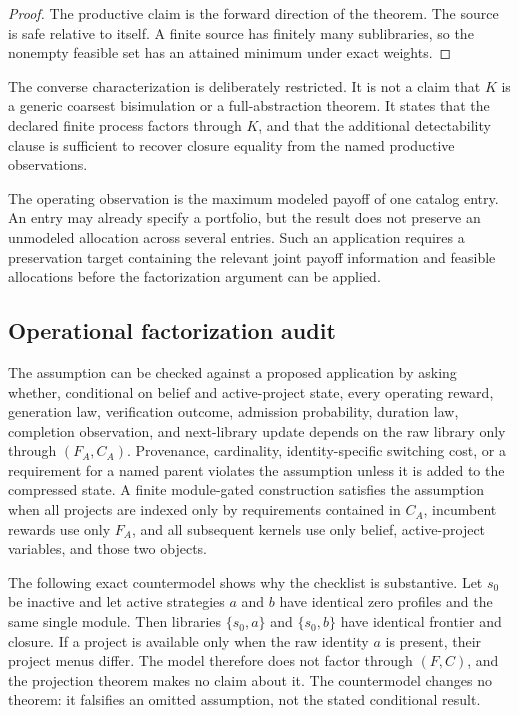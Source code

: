 \begin{proof}
The productive claim is the forward direction of the theorem. The source is
safe relative to itself. A finite source has finitely many sublibraries, so
the nonempty feasible set has an attained minimum under exact weights.
\end{proof}

The converse characterization is deliberately restricted. It is not a claim
that $K$ is a generic coarsest bisimulation or a full-abstraction theorem.
It states that the declared finite process factors through $K$, and that the
additional detectability clause is sufficient to recover closure equality
from the named productive observations.

The operating observation is the maximum modeled payoff of one catalog entry.
An entry may already specify a portfolio, but the result does not preserve an
unmodeled allocation across several entries. Such an application requires a
preservation target containing the relevant joint payoff information and
feasible allocations before the factorization argument can be applied.

\subsection{Operational factorization audit}

The assumption can be checked against a proposed application by asking whether,
conditional on belief and active-project state, every operating reward,
generation law, verification outcome, admission probability, duration law,
completion observation, and next-library update depends on the raw library only
through $(F_A,C_A)$. Provenance, cardinality, identity-specific switching cost,
or a requirement for a named parent violates the assumption unless it is added
to the compressed state. A finite module-gated construction satisfies the
assumption when all projects are indexed only by requirements contained in
$C_A$, incumbent rewards use only $F_A$, and all subsequent kernels use only
belief, active-project variables, and those two objects.

The following exact countermodel shows why the checklist is substantive. Let
$s_0$ be inactive and let active strategies $a$ and $b$ have identical zero
profiles and the same single module. Then libraries $\{s_0,a\}$ and
$\{s_0,b\}$ have identical frontier and closure. If a project is available only
when the raw identity $a$ is present, their project menus differ. The model
therefore does not factor through $(F,C)$, and the projection theorem makes no
claim about it. The countermodel changes no theorem: it falsifies an omitted
assumption, not the stated conditional result.
